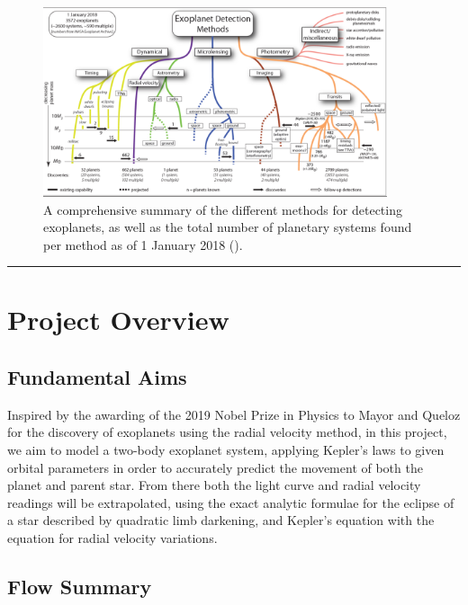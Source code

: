 \documentclass[11pt]{article}
\begin{document}
\quad
\begin{figure}[!ht]
	\centering 
	\includegraphics[width=0.9\textwidth]{../images/Detection.png}
	\caption{A comprehensive summary of the different methods for detecting
		exoplanets, as well as the total number of planetary systems found per
		method as of 1 January 2018 (\cite{Perryman}).} \label{Figure 1.b}
\end{figure}


\begin{center}\rule{0.5\linewidth}{0.5pt}\end{center}

    \hypertarget{project-overview}{%
\section{Project Overview}\label{project-overview}}


\hypertarget{fundamental-aims}{%
\subsection{Fundamental Aims}\label{fundamental-aims}}

Inspired by the awarding of the 2019 Nobel Prize in Physics to Mayor
and Queloz for the discovery of exoplanets using the radial velocity
method, in this project, we aim to model a two-body exoplanet system,
applying Kepler's laws to given orbital parameters in order to
accurately predict the movement of both the planet and parent star. From
there both the light curve and radial velocity readings will be
extrapolated, using the exact analytic formulae for the eclipse of a
star described by quadratic limb darkening, and Kepler's equation with
the equation for radial velocity variations.

\hypertarget{flow-summary}{%
\subsection{Flow Summary}\label{flow-summary}}
\end{document}
